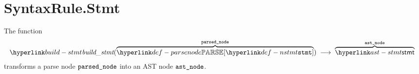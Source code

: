 \begin{mathpar}
\end{mathpar}

\section{SyntaxRule.Stmt \label{sec:SyntaxRule.Stmt}}
\hypertarget{build-stmt}{}
The function
\[
\buildstmt(\overname{\parsenode{\Nstmt}}{\vparsednode}) \;\aslto\; \overname{\stmt}{\vastnode}
\]
transforms a parse node $\vparsednode$ into an AST node $\vastnode$.


\begin{mathpar}
\end{mathpar}

\begin{mathpar}
\end{mathpar}

\begin{mathpar}
\end{mathpar}

